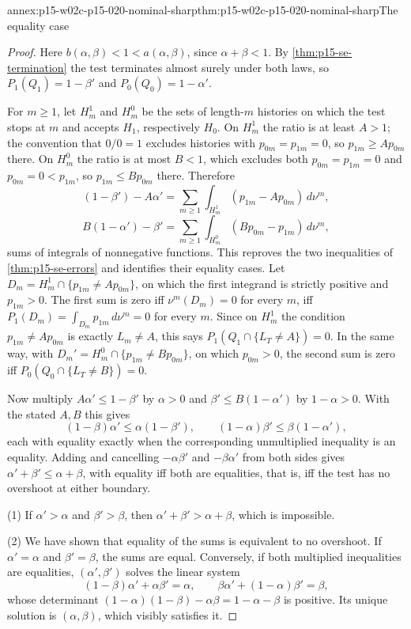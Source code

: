 \begin{annexitem}{annex:p15-w02c-p15-020-nominal-sharp}{thm:p15-w02c-p15-020-nominal-sharp}{The equality case}
\begin{proof}
Here \(b(\alpha,\beta)<1<a(\alpha,\beta)\), since \(\alpha+\beta<1\).
By \cref{thm:p15-se-termination} the test terminates almost surely under
both laws, so \(P_1(Q_1)=1-\beta'\) and \(P_0(Q_0)=1-\alpha'\).

For \(m\geq1\), let \(H_m^1\) and \(H_m^0\) be the sets of length-\(m\)
histories on which the test stops at \(m\) and accepts \(H_1\),
respectively \(H_0\). On \(H_m^1\) the ratio is at least \(A>1\); the
convention that \(0/0=1\) excludes histories with \(p_{0m}=p_{1m}=0\),
so \(p_{1m}\geq Ap_{0m}\) there. On \(H_m^0\) the ratio is at most
\(B<1\), which excludes both \(p_{0m}=p_{1m}=0\) and \(p_{0m}=0<p_{1m}\),
so \(p_{1m}\leq Bp_{0m}\) there. Therefore
\[
 (1-\beta')-A\alpha'=\sum_{m\geq1}\int_{H_m^1}(p_{1m}-Ap_{0m})\,d\nu^m,
\]
\[
 B(1-\alpha')-\beta'=\sum_{m\geq1}\int_{H_m^0}(Bp_{0m}-p_{1m})\,d\nu^m,
\]
sums of integrals of nonnegative functions. This reproves the two
inequalities of \cref{thm:p15-se-errors} and identifies their equality
cases. Let \(D_m=H_m^1\cap\{p_{1m}\neq Ap_{0m}\}\), on which the first
integrand is strictly positive and \(p_{1m}>0\). The first sum is zero
iff \(\nu^m(D_m)=0\) for every \(m\), iff \(P_1(D_m)=\int_{D_m}p_{1m}\,d\nu^m=0\)
for every \(m\). Since on \(H_m^1\) the condition \(p_{1m}\neq Ap_{0m}\)
is exactly \(L_m\neq A\), this says \(P_1(Q_1\cap\{L_T\neq A\})=0\).
In the same way, with \(D_m'=H_m^0\cap\{p_{1m}\neq Bp_{0m}\}\), on which
\(p_{0m}>0\), the second sum is zero iff
\(P_0(Q_0\cap\{L_T\neq B\})=0\).

Now multiply \(A\alpha'\leq1-\beta'\) by \(\alpha>0\) and
\(\beta'\leq B(1-\alpha')\) by \(1-\alpha>0\). With the stated \(A,B\)
this gives
\[
 (1-\beta)\alpha'\leq\alpha(1-\beta'),\qquad
 (1-\alpha)\beta'\leq\beta(1-\alpha'),
\]
each with equality exactly when the corresponding unmultiplied
inequality is an equality. Adding and cancelling \(-\alpha\beta'\) and
\(-\beta\alpha'\) from both sides gives \(\alpha'+\beta'\leq\alpha+\beta\),
with equality iff both are equalities, that is, iff the test has no
overshoot at either boundary.

(1) If \(\alpha'>\alpha\) and \(\beta'>\beta\), then
\(\alpha'+\beta'>\alpha+\beta\), which is impossible.

(2) We have shown that equality of the sums is equivalent to no
overshoot. If \(\alpha'=\alpha\) and \(\beta'=\beta\), the sums are
equal. Conversely, if both multiplied inequalities are equalities,
\((\alpha',\beta')\) solves the linear system
\[
 (1-\beta)\alpha'+\alpha\beta'=\alpha,\qquad
 \beta\alpha'+(1-\alpha)\beta'=\beta,
\]
whose determinant \((1-\alpha)(1-\beta)-\alpha\beta=1-\alpha-\beta\) is
positive. Its unique solution is \((\alpha,\beta)\), which visibly
satisfies it.


\end{proof}
\end{annexitem}
